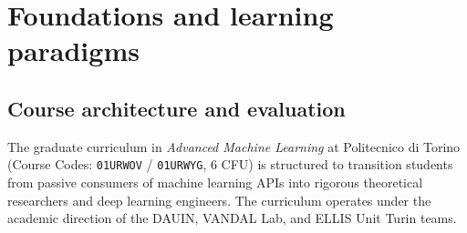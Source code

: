 \chapter{Foundations and learning paradigms}
\label{sec:foundations_and_paradigms}

\section{Course architecture and evaluation}
\label{sec:academic_environment}

The graduate curriculum in \emph{Advanced Machine Learning} at Politecnico di Torino (Course Codes: \texttt{01URWOV} / \texttt{01URWYG}, 6 CFU) is structured to transition students from passive consumers of machine learning APIs into rigorous theoretical researchers and deep learning engineers. The curriculum operates under the academic direction of the DAUIN, VANDAL Lab, and ELLIS Unit Turin teams.

